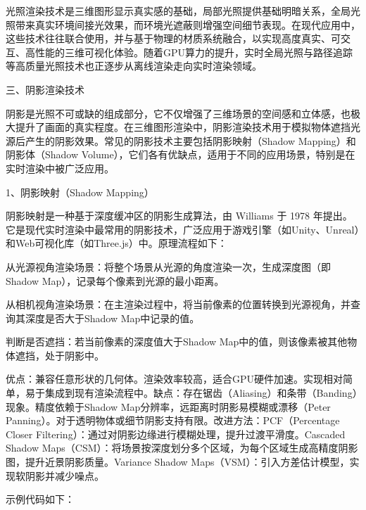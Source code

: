 光照渲染技术是三维图形显示真实感的基础，局部光照提供基础明暗关系，全局光照带来真实环境间接光效果，而环境光遮蔽则增强空间细节表现。在现代应用中，这些技术往往联合使用，并与基于物理的材质系统融合，以实现高度真实、可交互、高性能的三维可视化体验。随着GPU算力的提升，实时全局光照与路径追踪等高质量光照技术也正逐步从离线渲染走向实时渲染领域。

三、阴影渲染技术

阴影是光照不可或缺的组成部分，它不仅增强了三维场景的空间感和立体感，也极大提升了画面的真实程度。在三维图形渲染中，阴影渲染技术用于模拟物体遮挡光源后产生的阴影效果。常见的阴影技术主要包括阴影映射（Shadow Mapping）和阴影体（Shadow Volume），它们各有优缺点，适用于不同的应用场景，特别是在实时渲染中被广泛应用。

1、阴影映射（Shadow Mapping）

阴影映射是一种基于深度缓冲区的阴影生成算法，由 Williams 于 1978 年提出。它是现代实时渲染中最常用的阴影技术，广泛应用于游戏引擎（如Unity、Unreal）和Web可视化库（如Three.js）中。原理流程如下：

从光源视角渲染场景：将整个场景从光源的角度渲染一次，生成深度图（即 Shadow Map），记录每个像素到光源的最小距离。

从相机视角渲染场景：在主渲染过程中，将当前像素的位置转换到光源视角，并查询其深度是否大于Shadow Map中记录的值。

判断是否遮挡：若当前像素的深度值大于Shadow Map中的值，则该像素被其他物体遮挡，处于阴影中。

优点：兼容任意形状的几何体。渲染效率较高，适合GPU硬件加速。实现相对简单，易于集成到现有渲染流程中。缺点：存在锯齿（Aliasing）和条带（Banding）现象。精度依赖于Shadow Map分辨率，远距离时阴影易模糊或漂移（Peter Panning）。对于透明物体或细节阴影支持有限。改进方法：PCF（Percentage Closer Filtering）：通过对阴影边缘进行模糊处理，提升过渡平滑度。Cascaded Shadow Maps（CSM）：将场景按深度划分多个区域，为每个区域生成高精度阴影图，提升近景阴影质量。Variance Shadow Maps（VSM）：引入方差估计模型，实现软阴影并减少噪点。

示例代码如下：

